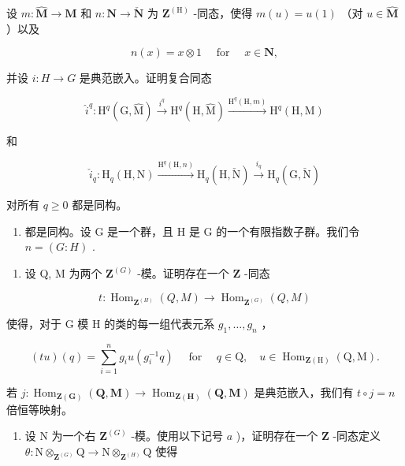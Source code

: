 设 \(m:\hat{\mathbf{M}}\to \mathbf{M}\) 和 \(n:\mathbf{N}\rightarrow \check{\mathbf{N}}\) 为 \(\mathbf{Z}^{(\mathrm{H})}\) -同态，使得 \(m(u) = u(1)\) （对 \(u\in \hat{\mathbf{M}}\) ）以及

\[
n (x) = x \otimes 1 \quad \text { for } \quad x \in \mathbf {N}  ,
\]

并设 \(i: H \to G\) 是典范嵌入。证明复合同态

\[
\hat {i} ^ {q}: \mathrm{H} ^ {q} (\mathrm{G}, \hat {\mathrm{M}}) \xrightarrow {i ^ {q}} \mathrm{H} ^ {q} (\mathrm{H}, \hat {\mathrm{M}}) \xrightarrow {\mathrm{H} ^ {q} (\mathrm{H} , m)} \mathrm{H} ^ {q} (\mathrm{H}, \mathrm{M})
\]

和

\[
\check {i} _ {q}: \mathrm{H} _ {q} (\mathrm{H}, \mathrm{N}) \xrightarrow {\mathrm{H} ^ {q} (\mathrm{H} , n)} \mathrm{H} _ {q} (\mathrm{H}, \check {\mathrm{N}}) \xrightarrow {i _ {q}} \mathrm{H} _ {q} (\mathrm{G}, \check {\mathrm{N}})
\]

对所有 \(q \geqslant 0\) 都是同构。

\begin{enumerate}
\def\labelenumi{\arabic{enumi})}
\setcounter{enumi}{13}
\tightlist
\item
  都是同构。设 G 是一个群，且 H 是 G 的一个有限指数子群。我们令 \(n = (G:H)\) .
\end{enumerate}

\begin{enumerate}
\def\labelenumi{\alph{enumi})}
\tightlist
\item
  设 Q, M 为两个 \(\mathbf{Z}^{(G)}\) -模。证明存在一个 \(\mathbf{Z}\) -同态
\end{enumerate}

\[
t: \operatorname{Hom} _ {\mathbf {Z} ^ {(H)}} (Q, M) \rightarrow \operatorname{Hom} _ {\mathbf {Z} ^ {(G)}} (Q, M)
\]

使得，对于 G 模 H 的类的每一组代表元系 \(g_{1}, \ldots, g_{n}\) ，

\[
(t u) (q) = \sum_ {i = 1} ^ {n} g _ {i} u \left(g _ {i} ^ {- 1} q\right) \quad \text { for } \quad q \in \mathrm{Q}, \quad u \in \operatorname{Hom} _ {\mathbf {Z} (\mathrm{H})} (\mathrm{Q}, \mathrm{M}).
\]

若 \(j: \operatorname{Hom}_{\mathbf{Z}(\mathbf{G})}(\mathbf{Q}, \mathbf{M}) \to \operatorname{Hom}_{\mathbf{Z}(\mathbf{H})}(\mathbf{Q}, \mathbf{M})\) 是典范嵌入，我们有 \(t \circ j = n\) 倍恒等映射。

\begin{enumerate}
\def\labelenumi{\alph{enumi})}
\setcounter{enumi}{1}
\tightlist
\item
  设 N 为一个右 \(\mathbf{Z}^{(G)}\) -模。使用以下记号 \(a\) )，证明存在一个 \(\mathbf{Z}\) -同态定义 \(\theta: \mathrm{N} \otimes_{\mathbf{Z}^{(G)}} \mathrm{Q} \to \mathrm{N} \otimes_{\mathbf{Z}^{(H)}} \mathrm{Q}\) 使得
\end{enumerate}

